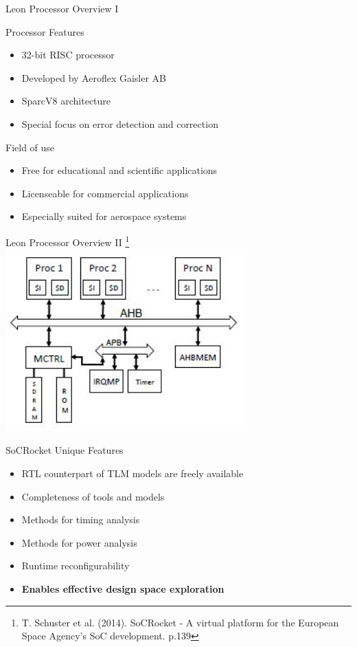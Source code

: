 \begin{frame}{Leon Processor Overview I}
    \begin{block}{Processor Features}
      \begin{itemize}
        \item 32-bit RISC processor
        \item Developed by Aeroflex Gaisler AB
        \item SparcV8 architecture
        \item Special focus on error detection and correction
      \end{itemize} 

    \end{block} \pause
    
    \begin{block}{Field of use}
      \begin{itemize}
        \item Free for educational and scientific applications
        \item Licenseable for commercial applications
        \item Especially suited for aerospace systems
      \end{itemize} 

    \end{block}

\end{frame}

\begin{frame}{Leon Processor Overview II 
\footnote{T. Schuster et al. (2014). SoCRocket - A virtual platform for the European Space Agency's SoC development. p.139}}
    \includegraphics[height=7cm]{pictures/LeonArch.JPG}
\end{frame}

\begin{frame}{SoCRocket Unique Features}
    \begin{itemize}
        \item RTL counterpart of TLM models are freely available
        \item Completeness of tools and models
        \item Methods for timing analysis
        \item Methods for power analysis
        \item Runtime reconfigurability
        \item \textbf{Enables effective design space exploration}
    \end{itemize}
\end{frame}

